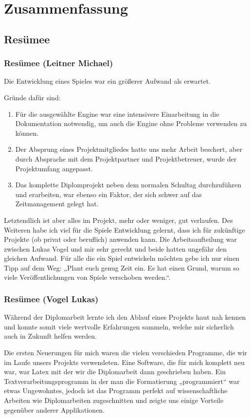 \chapter{Zusammenfassung}
\section{Resümee}
\subsection{Resümee (Leitner Michael)}
Die Entwicklung eines Spieles war ein größerer Aufwand als erwartet.

Gründe dafür sind:
\begin{enumerate}
	\item Für die ausgewählte Engine war eine intensivere Einarbeitung in die Dokumentation notwendig, um auch die Engine ohne Probleme verwenden zu können.
	\item Der Absprung eines Projektmitgliedes hatte uns mehr Arbeit beschert, aber durch Absprache mit dem Projektpartner und Projektbetreuer, wurde der Projektumfang angepasst.
	\item Das komplette Diplomprojekt neben dem normalen Schultag durchzuführen und erarbeiten, war ebenso ein Faktor, der sich schwer auf das Zeitmanagement gelegt hat.
\end{enumerate}
	
Letztendlich ist aber alles im Projekt, mehr oder weniger, gut verlaufen. Des Weiteren habe ich viel für die Spiele Entwicklung gelernt, dass ich für zukünftige Projekte (ob privat oder beruflich) anwenden kann. Die Arbeitsaufteilung war zwischen Lukas Vogel und mir sehr gerecht und beide hatten ungefähr den gleichen Aufwand. Für alle die ein Spiel entwickeln möchten gebe ich nur einen Tipp auf dem Weg: „Plant euch genug Zeit ein. Es hat einen Grund, warum so viele Veröffentlichungen von Spiele verschoben werden.“.

\subsection{Resümee (Vogel Lukas)}
Während der Diplomarbeit lernte ich den Ablauf eines Projekts haut nah kennen und konnte somit viele wertvolle Erfahrungen sammeln, welche mir sicherlich auch in Zukunft helfen werden.

Die ersten Neuerungen für mich waren die vielen verschieden Programme, die wir im Laufe unsers Projekts verwendeten. Eine Software, die für mich komplett neu war, war Latex mit der wir die Diplomarbeit dann geschrieben haben. Ein Textverarbeitungsprogramm in der man die Formatierung „programmiert“ war etwas Ungewohntes, jedoch ist das Programm perfekt auf wissenschaftliche Arbeiten wie Diplomarbeiten zugeschnitten und zeigte uns einige Vorteile gegenüber anderer Applikationen.  

